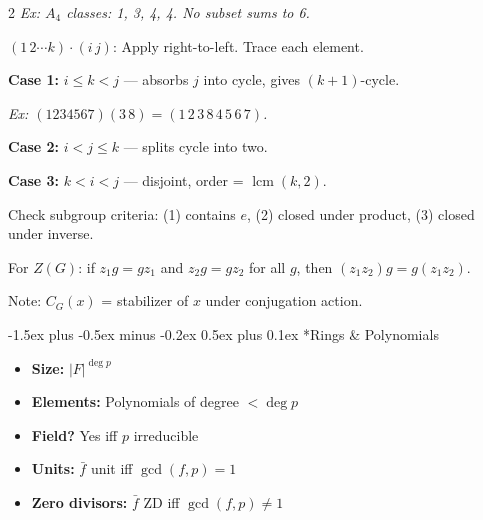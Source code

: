 \documentclass[8pt,a4paper]{extarticle}
\makeatletter
\newcommand{\lcm}{\operatorname{lcm}}
\renewcommand\subsection{\@startsection{subsection}{2}{\z@}%
  {-1.5ex plus -0.5ex minus -0.2ex}%
  {0.5ex plus 0.1ex}%
  {\normalfont\normalsize\bfseries}}
\makeatother
\begin{document}
\begin{multicols}{2}
\textit{Ex: $A_4$ classes: 1, 3, 4, 4. No subset sums to 6.}

\vspace{6pt}
\vspace{3pt}

$(1\,2\cdots k) \cdot (i\,j)$: Apply right-to-left. Trace each element.

\textbf{Case 1:} $i \le k < j$ — absorbs $j$ into cycle, gives $(k{+}1)$-cycle.

\textit{Ex: $(1234567)(3\,8) = (1\,2\,3\,8\,4\,5\,6\,7)$.}

\textbf{Case 2:} $i < j \le k$ — splits cycle into two.

\textbf{Case 3:} $k < i < j$ — disjoint, order = $\lcm(k, 2)$.

\vspace{6pt}
\vspace{3pt}

Check subgroup criteria: (1) contains $e$, (2) closed under product, (3) closed under inverse.

For $Z(G)$: if $z_1g = gz_1$ and $z_2g = gz_2$ for all $g$, then $(z_1z_2)g = g(z_1z_2)$.

Note: $C_G(x)$ = stabilizer of $x$ under conjugation action.

\subsection*{Rings \& Polynomials}

\vspace{3pt}
\vspace{3pt}

\begin{itemize}[leftmargin=*, itemsep=1pt, topsep=2pt]
\item \textbf{Size:} $|F|^{\deg p}$
\item \textbf{Elements:} Polynomials of degree $< \deg p$
\item \textbf{Field?} Yes iff $p$ irreducible
\item \textbf{Units:} $\bar{f}$ unit iff $\gcd(f,p) = 1$
\item \textbf{Zero divisors:} $\bar{f}$ ZD iff $\gcd(f,p) \neq 1$
\end{itemize}


\end{multicols}
\end{document}
